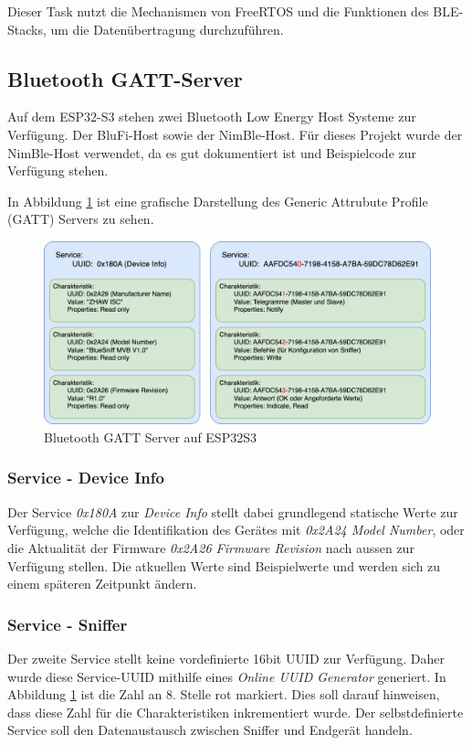 Dieser Task nutzt die Mechanismen von FreeRTOS und die Funktionen des BLE-Stacks, um die Datenübertragung durchzuführen.



\subsection{Bluetooth GATT-Server}
\label{sub:BluetoothGATT}
Auf dem ESP32-S3 stehen zwei Bluetooth Low Energy Host Systeme zur Verfügung. Der BluFi-Host sowie der NimBle-Host. Für dieses Projekt wurde der NimBle-Host verwendet, da es gut dokumentiert ist und Beispielcode zur Verfügung stehen.

In Abbildung \ref{fig:BLEGATT} ist eine grafische Darstellung des Generic Attrubute Profile (GATT) Servers zu sehen.

\begin{figure}[H]
    \centering
    \includegraphics[width=0.9\linewidth]{Figures/Chap3/ESP/BLE/BLE.png}
    \caption{Bluetooth GATT Server auf ESP32S3}
    \label{fig:BLEGATT}
\end{figure}

\subsubsection{Service - Device Info}
Der Service \textit{0x180A} zur \textit{Device Info} stellt dabei grundlegend statische Werte zur Verfügung, welche die Identifikation des Gerätes mit \textit{0x2A24 Model Number}, oder die Aktualität der Firmware \textit{0x2A26 Firmware Revision} nach aussen zur Verfügung stellen. Die atkuellen Werte sind Beispielwerte und werden sich zu einem späteren Zeitpunkt ändern. 

\subsubsection{Service - Sniffer}
Der zweite Service stellt keine vordefinierte 16bit UUID zur Verfügung. Daher wurde diese Service-UUID mithilfe eines \textit{Online UUID Generator} generiert. In Abbildung \ref{fig:BLEGATT} ist die Zahl an 8. Stelle rot markiert. Dies soll darauf hinweisen, dass diese Zahl für die Charakteristiken inkrementiert wurde. Der selbstdefinierte Service soll den Datenaustausch zwischen Sniffer und Endgerät handeln. 

